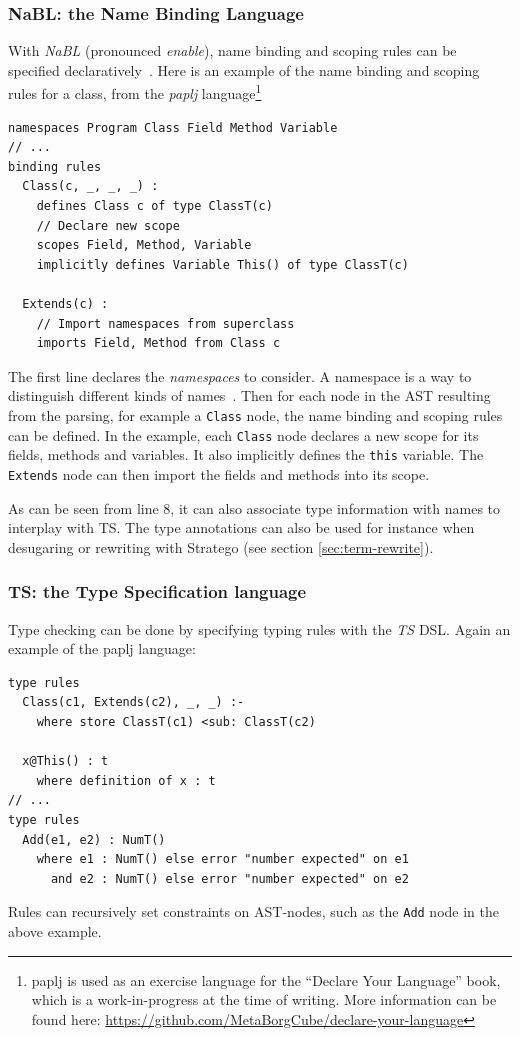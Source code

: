 \subsubsection{NaBL: the Name Binding Language}
\label{sec:nabl}
With \emph{NaBL} (pronounced \emph{enable}), name binding and scoping rules can
be specified declaratively~\cite{KonatKWV12}. Here is an example
of the name binding and scoping rules for a class, from the \emph{paplj}
language\footnote{paplj is used as an exercise language for the
``Declare Your Language'' book, which is a work-in-progress at the time
of writing. More information can be found here:
\url{https://github.com/MetaBorgCube/declare-your-language}}
\lstset{language=nabl,numbers=left}
\begin{lstlisting}
namespaces Program Class Field Method Variable
// ...
binding rules
  Class(c, _, _, _) :
    defines Class c of type ClassT(c)
    // Declare new scope
    scopes Field, Method, Variable
    implicitly defines Variable This() of type ClassT(c)

  Extends(c) :
    // Import namespaces from superclass
    imports Field, Method from Class c
\end{lstlisting}
The first line declares the \emph{namespaces} to consider. A namespace is a
way to distinguish different kinds of
names~\cite{KonatKWV12}. Then for each node in the AST resulting
from the parsing, for example a \texttt{Class} node, the name binding and
scoping rules can be defined. In the example, each \texttt{Class} node
declares a new scope for its fields, methods and variables. It also
implicitly defines the \texttt{this} variable. The \texttt{Extends} node can then
import the fields and methods into its scope.

As can be seen from line 8, it can also associate type information
with names to interplay with TS. The type annotations can also be used
for instance when desugaring or rewriting with Stratego (see section
\ref{sec:term-rewrite}).
\subsubsection{TS: the Type Specification language}
\label{sec:orgheadline3}
Type checking can be done by specifying typing rules with the \emph{TS}
DSL. Again an example of the paplj language:
\lstset{language=type-spec,numbers=left}
\begin{lstlisting}
type rules
  Class(c1, Extends(c2), _, _) :-
    where store ClassT(c1) <sub: ClassT(c2)

  x@This() : t
    where definition of x : t
// ...
type rules
  Add(e1, e2) : NumT()
    where e1 : NumT() else error "number expected" on e1
      and e2 : NumT() else error "number expected" on e2
\end{lstlisting}
Rules can recursively set constraints on AST-nodes, such as the \texttt{Add}
node in the above example.

